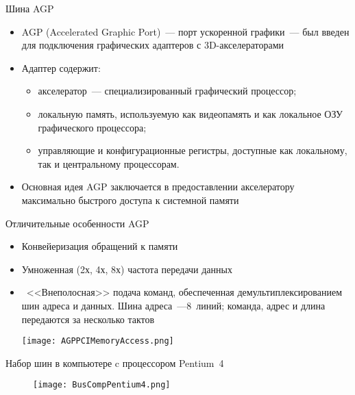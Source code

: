 \documentclass[aspectratio=169,14pt]{beamer}
\begin{document}
\begin{frame}{Шина AGP}
    \begin{itemize}
        \item AGP (Accelerated Graphic Port)~--- порт ускоренной
        графики~--- был введен для подключения графических адаптеров
        с 3D-акселераторами
        \item Адаптер содержит:
        \begin{itemize}
            \item акселератор~--- специализированный графический процессор;
            \item локальную память, используемую как видеопамять и как
            локальное ОЗУ графического процессора;
            \item управляющие и конфигурационные регистры, доступные
            как локальному, так и центральному процессорам.
        \end{itemize}
        \item Основная идея AGP заключается в предоставлении
        акселератору максимально быстрого доступа к системной памяти
    \end{itemize}
\end{frame}

\begin{frame}{Отличительные особенности AGP}
    \begin{itemize}
        \item Конвейеризация обращений к памяти
        \item Умноженная (2х, 4х, 8х) частота передачи данных
        \item ~<<Внеполосная>> подача команд, обеспеченная
        демультиплексированием шин адреса и данных. Шина адреса~---8~линий;
        команда, адрес и длина передаются за несколько тактов

        \texttt{[image: AGPPCIMemoryAccess.png]}
    \end{itemize}
\end{frame}

\begin{frame}{Набор шин в компьютере c процессором Pentium~4}
    \begin{figure}
        \centering
        \texttt{[image: BusCompPentium4.png]}
    \end{figure}
\end{frame}
\end{document}
